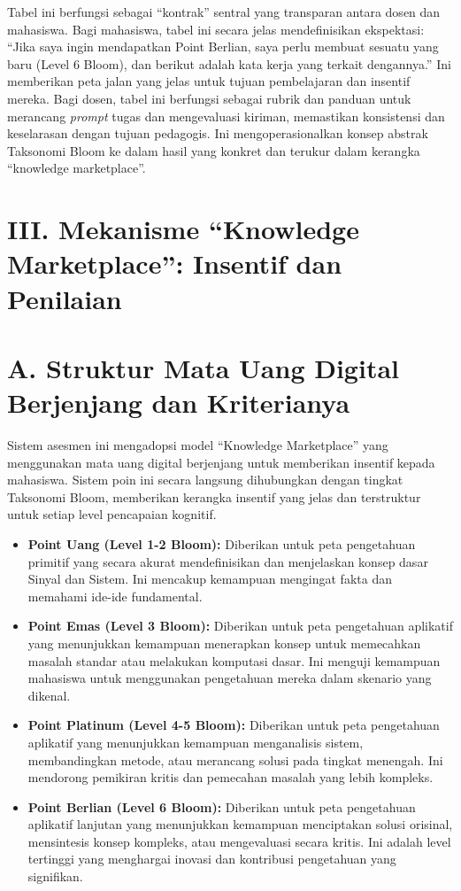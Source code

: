 \documentclass[
  letterpaper,
  DIV=11,
  numbers=noendperiod]{scrreprt}
\begin{document}
Tabel ini berfungsi sebagai ``kontrak'' sentral yang transparan antara
dosen dan mahasiswa. Bagi mahasiswa, tabel ini secara jelas
mendefinisikan ekspektasi: ``Jika saya ingin mendapatkan Point Berlian,
saya perlu membuat sesuatu yang baru (Level 6 Bloom), dan berikut adalah
kata kerja yang terkait dengannya.'' Ini memberikan peta jalan yang
jelas untuk tujuan pembelajaran dan insentif mereka. Bagi dosen, tabel
ini berfungsi sebagai rubrik dan panduan untuk merancang \emph{prompt}
tugas dan mengevaluasi kiriman, memastikan konsistensi dan keselarasan
dengan tujuan pedagogis. Ini mengoperasionalkan konsep abstrak Taksonomi
Bloom ke dalam hasil yang konkret dan terukur dalam kerangka ``knowledge
marketplace''.

\section{III. Mekanisme ``Knowledge Marketplace'': Insentif dan
Penilaian}\label{iii.-mekanisme-knowledge-marketplace-insentif-dan-penilaian}

\section{A. Struktur Mata Uang Digital Berjenjang dan
Kriterianya}\label{a.-struktur-mata-uang-digital-berjenjang-dan-kriterianya}

Sistem asesmen ini mengadopsi model ``Knowledge Marketplace'' yang
menggunakan mata uang digital berjenjang untuk memberikan insentif
kepada mahasiswa. Sistem poin ini secara langsung dihubungkan dengan
tingkat Taksonomi Bloom, memberikan kerangka insentif yang jelas dan
terstruktur untuk setiap level pencapaian kognitif.

\begin{itemize}
\item
  \textbf{Point Uang (Level 1-2 Bloom):} Diberikan untuk peta
  pengetahuan primitif yang secara akurat mendefinisikan dan menjelaskan
  konsep dasar Sinyal dan Sistem. Ini mencakup kemampuan mengingat fakta
  dan memahami ide-ide fundamental.
\item
  \textbf{Point Emas (Level 3 Bloom):} Diberikan untuk peta pengetahuan
  aplikatif yang menunjukkan kemampuan menerapkan konsep untuk
  memecahkan masalah standar atau melakukan komputasi dasar. Ini menguji
  kemampuan mahasiswa untuk menggunakan pengetahuan mereka dalam
  skenario yang dikenal.
\item
  \textbf{Point Platinum (Level 4-5 Bloom):} Diberikan untuk peta
  pengetahuan aplikatif yang menunjukkan kemampuan menganalisis sistem,
  membandingkan metode, atau merancang solusi pada tingkat menengah. Ini
  mendorong pemikiran kritis dan pemecahan masalah yang lebih kompleks.
\item
  \textbf{Point Berlian (Level 6 Bloom):} Diberikan untuk peta
  pengetahuan aplikatif lanjutan yang menunjukkan kemampuan menciptakan
  solusi orisinal, mensintesis konsep kompleks, atau mengevaluasi secara
  kritis. Ini adalah level tertinggi yang menghargai inovasi dan
  kontribusi pengetahuan yang signifikan.
\end{itemize}
\end{document}
